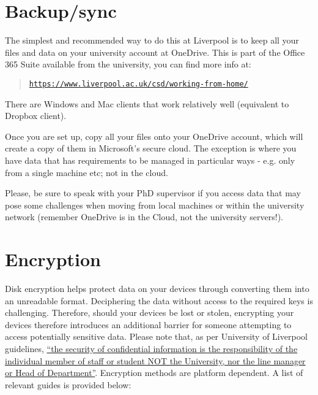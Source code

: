 \documentclass[
]{book}
\begin{document}
\hypertarget{backupsync}{%
\section{Backup/sync}\label{backupsync}}

The simplest and recommended way to do this at Liverpool is to keep all your
files and data on your university account at OneDrive. This is part of the
Office 365 Suite available from the university, you can find more info at:

\begin{quote}
\href{https://www.liverpool.ac.uk/csd/working-from-home/}{\texttt{https://www.liverpool.ac.uk/csd/working-from-home/}}
\end{quote}

There are Windows and Mac clients that work relatively well (equivalent to
Dropbox client).

Once you are set up, copy all your files onto your OneDrive account, which
will create a copy of them in Microsoft's secure cloud. The exception is
where you have data that has requirements to be managed in particular ways - e.g.
only from a single machine etc; not in the cloud.

Please, be sure to speak with your PhD supervisor if you access data that
may pose some challenges when moving from local machines or within the university
network (remember OneDrive is in the Cloud, not the university servers!).

\hypertarget{encryption}{%
\section{Encryption}\label{encryption}}

Disk encryption helps protect data on your devices through converting
them into an unreadable format. Deciphering the data without access to the
required keys is challenging. Therefore, should your devices be lost or stolen,
encrypting your devices therefore introduces an additional barrier for someone
attempting to access potentially sensitive data. Please note that, as per
University of Liverpool guidelines,
\href{https://www.liverpool.ac.uk/csd/security/information-security/encryption/}{``the security of confidential information is the responsibility of the individual
member of staff or student NOT the University, nor the line manager or Head of
Department''}.
Encryption methods are platform dependent. A list of relevant guides is provided below:
\end{document}
